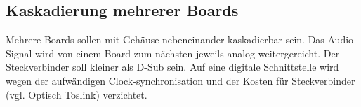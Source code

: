 \subsection{Kaskadierung mehrerer Boards}
\label{sec:Konzept_Kaskadierung}

Mehrere Boards sollen mit Gehäuse nebeneinander kaskadierbar sein. 
Das Audio Signal wird von einem Board zum nächsten jeweils analog weitergereicht. 
Der Steckverbinder soll kleiner als D-Sub sein. 
Auf eine digitale Schnittstelle wird wegen der aufwändigen Clock-synchronisation und der Kosten für Steckverbinder (vgl. Optisch Toslink) verzichtet.


